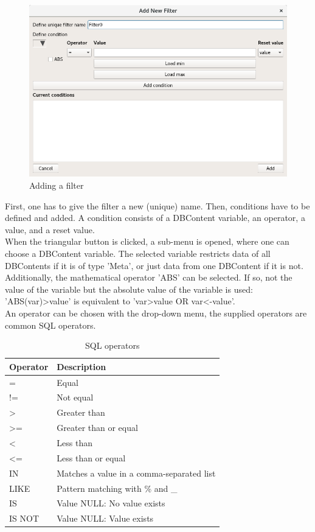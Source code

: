 \begin{figure}[H]
  \center
    \includegraphics[width=14cm,frame]{figures/filter_add.png}
  \caption{Adding a filter}
  \label{fig:filter_add}
\end{figure}

First, one has to give the filter a new (unique) name. Then, conditions have to be defined and added. A condition consists of a DBContent variable, an operator, a value, and a reset value. \\

When the triangular button is clicked, a sub-menu is opened, where one can choose a DBContent variable. The selected variable restricts data of all DBContents if it is of type 'Meta', or just data from one DBContent if it is not. Additionally, the mathematical operator 'ABS' can be selected. If so, not the value of the variable but the absolute value of the variable is used: 'ABS(var)>value' is equivalent to 'var>value OR var<-value'. \\

An operator can be chosen with the drop-down menu, the supplied operators are common SQL operators.

\begin{table}[H]
  \center
  \begin{tabular}{ | l | l |}
    \hline
    \textbf{Operator} & \textbf{Description} \\ \hline
    = & Equal \\ \hline
    != & Not equal \\ \hline
    > & Greater than \\ \hline
    >= & Greater than or equal \\ \hline
    < & Less than \\ \hline
    <= & Less than or equal \\ \hline
    IN & Matches a value in a comma-separated list \\ \hline
    LIKE & Pattern matching with \% and \_ \\ \hline
    IS & Value NULL: No value exists \\ \hline
    IS NOT & Value NULL: Value exists \\
    \hline
  \end{tabular}
  \caption{SQL operators}
\end{table}

